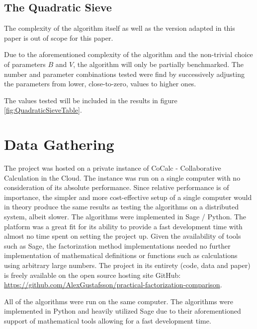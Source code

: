 \subsection{The Quadratic Sieve}

The complexity of the algorithm itself as well as the version adapted in this paper is out of scope for this paper.

Due to the aforementioned complexity of the algorithm and the non-trivial choice of parameters $B$ and $V$, the algorithm will only be partially benchmarked. The number and parameter combinations tested were find by successively adjusting the parameters from lower, close-to-zero, values to higher ones.

The values tested will be included in the results in figure \ref{fig:QuadraticSieveTable}.

\section{Data Gathering}

The project was hosted on a private instance of CoCalc - Collaborative Calculation in the Cloud. The instance was run on a single computer with no consideration of its absolute performance. Since relative performance is of importance, the simpler and more cost-effective setup of a single computer would in theory produce the same results as testing the algorithms on a distributed system, albeit slower. The algorithms were implemented in Sage / Python. The platform was a great fit for its ability to provide a fast development time with almost no time spent on setting the project up. Given the availability of tools such as Sage, the factorization method implementations needed no further implementation of mathematical definitions or functions such as calculations using arbitrary large numbers. The project in its entirety (code, data and paper) is freely available on the open source hosting site GitHub: \href{https://github.com/AlexGustafsson/practical-factorization-comparison}{https://github.com/AlexGustafsson/practical-factorization-comparison}.

All of the algorithms were run on the same computer. The algorithms were implemented in Python and heavily utilized Sage due to their aforementioned support of mathematical tools allowing for a fast development time.

